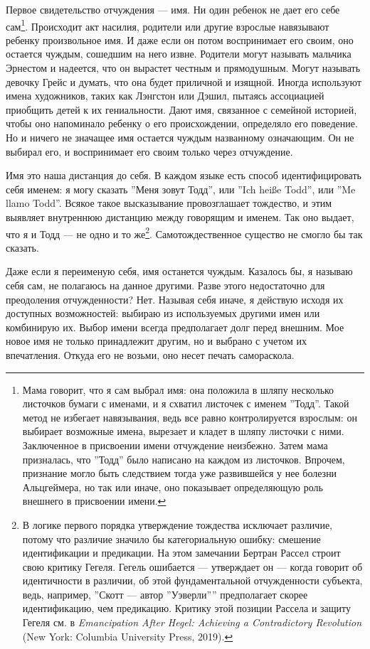 \documentclass[12pt]{book}
\begin{document}
Первое свидетельство отчуждения --- имя. Ни один ребенок не дает его себе сам\footnote{Мама говорит, что я сам выбрал имя: она положила в шляпу несколько листочков бумаги с именами, и я схватил листочек с именем ''Тодд''. Такой метод не избегает навязывания, ведь все равно контролируется взрослым: он выбирает возможные имена, вырезает и кладет в шляпу листочки с ними. Заключенное в присвоении имени отчуждение неизбежно. Затем мама призналась, что ''Тодд'' было написано на каждом из листочков. Впрочем, признание могло быть следствием тогда уже развившейся у нее болезни Альцгеймера, но так или иначе, оно показывает определяющую роль внешнего в присвоении имени.}. Происходит акт насилия, родители или другие взрослые навязывают ребенку произвольное имя. И даже если он потом воспринимает его своим, оно остается чуждым, сошедшим на него извне. Родители могут называть мальчика Эрнестом и надеется, что он вырастет честным и прямодушным. Могут называть девочку Грейс и думать, что она будет приличной и изящной. Иногда используют имена художников, таких как Лэнгстон или Дэшил, пытаясь ассоциацией приобщить детей к их гениальности. Дают имя, связанное с семейной историей, чтобы оно напоминало ребенку о его происхождении, определяло его поведение. Но и ничего не значащее имя остается чуждым названному означающим. Он не выбирал его, и воспринимает его своим только через отчуждение.

Имя это наша дистанция до себя. В каждом языке есть способ идентифицировать себя именем: я могу сказать ''Меня зовут Тодд'', или ''Ich heiße Todd'', или ''Me llamo Todd''. Всякое такое высказывание провозглашает тождество, и этим выявляет внутреннюю дистанцию между говорящим и именем. Так оно выдает, что я и Тодд --- не одно и то же\footnote{В логике первого порядка утверждение тождества исключает различие, потому что различие значило бы категориальную ошибку: смешение идентификации и предикации. На этом замечании Бертран Рассел строит свою критику Гегеля. Гегель ошибается --- утверждает он --- когда говорит об идентичности в различии, об этой фундаментальной отчужденности субъекта, ведь, например, ''Скотт --- автор ''Уэверли'''' предполагает скорее идентификацию, чем предикацию. Критику этой позиции Рассела и защиту Гегеля см. в \textit{Emancipation After Hegel: Achieving a Contradictory Revolution} (New York: Columbia University Press, 2019).}. Самотождественное существо не смогло бы так сказать.

Даже если я переименую себя, имя останется чуждым. Казалось бы, я называю себя сам, не полагаюсь на данное другими. Разве этого недостаточно для преодоления отчужденности? Нет. Называя себя иначе, я действую исходя их доступных возможностей: выбираю из используемых другими имен или комбинирую их. Выбор имени всегда предполагает долг перед внешним. Мое новое имя не только принадлежит другим, но и выбрано с учетом их впечатления. Откуда его не возьми, оно несет печать самораскола.
\end{document}
